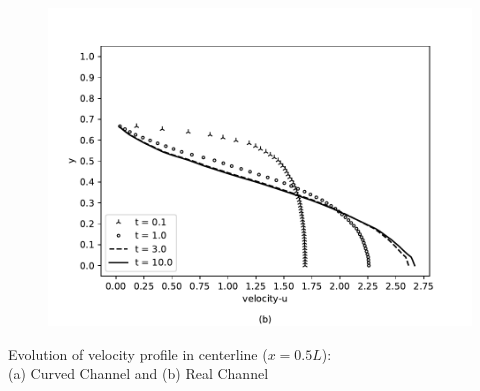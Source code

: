 \begin{frame}
\begin{figure}
\begin{minipage}{.50\linewidth}
      \includegraphics[scale=0.35]{images/vel_RealStrut_evol.pdf}\\
     \end{minipage}
\end{figure}
\vspace{-0.2cm}
\centering \tiny Evolution of velocity profile in centerline ($x=0.5L$):\\
                       (a) Curved Channel and (b) Real Channel
\end{frame}
\fi


